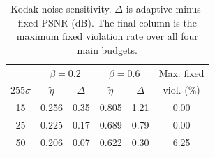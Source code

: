 \begin{table}[t]
\centering
\caption{Kodak noise sensitivity. $\Delta$ is adaptive-minus-fixed PSNR (dB). The final column is the maximum fixed violation rate over all four main budgets.}
\label{tab:noise}
\setlength{\tabcolsep}{2pt}
\begin{tabular*}{\columnwidth}{@{\extracolsep{\fill}}cccccc@{}}
\toprule
&\multicolumn{2}{c}{$\beta=0.2$}&\multicolumn{2}{c}{$\beta=0.6$}&Max. fixed\\
$255\sigma$&$\widetilde\eta$&$\Delta$&$\widetilde\eta$&$\Delta$&viol. (\%)\\
\midrule
15&0.256&0.35&0.805&1.21&0.00\\
25&0.225&0.17&0.689&0.79&0.00\\
50&0.206&0.07&0.622&0.30&6.25\\
\bottomrule
\end{tabular*}
\end{table}
